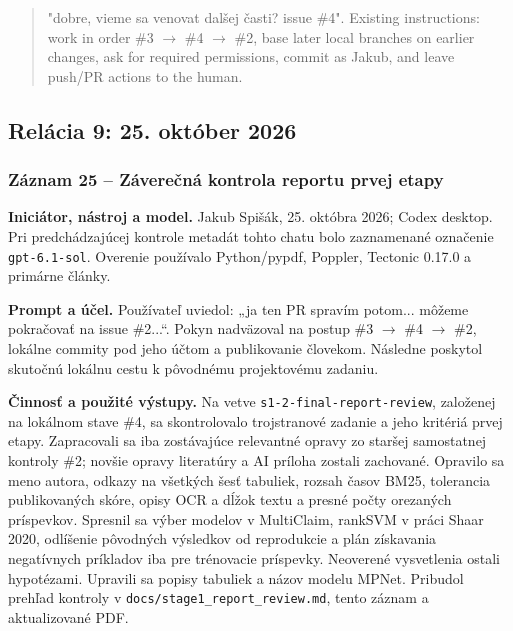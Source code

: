 \begin{quote}\normalsize "dobre, vieme sa venovat dalšej časti? issue \#4". Existing instructions: work in order \#3 $\to$ \#4 $\to$ \#2, base later local branches on earlier changes, ask for required permissions, commit as Jakub, and leave push/PR actions to the human.\end{quote}

\clearpage
{}\subsection*{Relácia 9: 25. október 2026}
\subsubsection*{Záznam 25 -- Záverečná kontrola reportu prvej etapy}
\par\noindent \textbf{Iniciátor, nástroj a model.} Jakub Spišák, 25. októbra 2026; Codex desktop. Pri predchádzajúcej kontrole metadát tohto chatu bolo zaznamenané označenie \texttt{gpt-\allowbreak{}6.\allowbreak{}1-\allowbreak{}sol}. Overenie používalo Python/pypdf, Poppler, Tectonic 0.17.0 a primárne články.\par\smallskip
\par\noindent \textbf{Prompt a účel.} Používateľ uviedol: „ja ten PR spravím potom... môžeme pokračovať na issue \#2...“. Pokyn nadväzoval na postup \#3 $\to$ \#4 $\to$ \#2, lokálne commity pod jeho účtom a publikovanie človekom. Následne poskytol skutočnú lokálnu cestu k pôvodnému projektovému zadaniu.\par\smallskip
\par\noindent \textbf{Činnosť a použité výstupy.} Na vetve \texttt{s1-\allowbreak{}2-\allowbreak{}final-\allowbreak{}report-\allowbreak{}review}, založenej na lokálnom stave \#4, sa skontrolovalo trojstranové zadanie a jeho kritériá prvej etapy. Zapracovali sa iba zostávajúce relevantné opravy zo staršej samostatnej kontroly \#2; novšie opravy literatúry a AI príloha zostali zachované. Opravilo sa meno autora, odkazy na všetkých šesť tabuliek, rozsah časov BM25, tolerancia publikovaných skóre, opisy OCR a dĺžok textu a presné počty orezaných príspevkov. Spresnil sa výber modelov v MultiClaim, rankSVM v práci Shaar 2020, odlíšenie pôvodných výsledkov od reprodukcie a plán získavania negatívnych príkladov iba pre trénovacie príspevky. Neoverené vysvetlenia ostali hypotézami. Upravili sa popisy tabuliek a názov modelu MPNet. Pribudol prehľad kontroly v \texttt{docs/\allowbreak{}stage1\_\allowbreak{}report\_\allowbreak{}review.\allowbreak{}md}, tento záznam a aktualizované PDF.\par\smallskip

